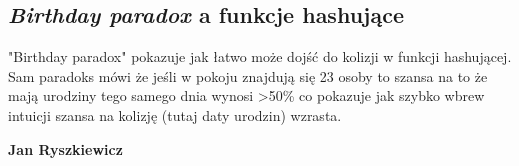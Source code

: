 \documentclass{article}
\begin{document}
\subsection{\textsl{Birthday paradox} a funkcje hashujące}
"Birthday paradox" pokazuje jak łatwo może dojść do kolizji w funkcji hashującej. 
Sam paradoks mówi że jeśli w pokoju znajdują się 23 osoby to szansa na to że mają urodziny tego
samego dnia wynosi >50\% co pokazuje jak szybko wbrew intuicji szansa na kolizję (tutaj daty urodzin) wzrasta.

\hfill
\textbf{Jan Ryszkiewicz}
\end{document}
